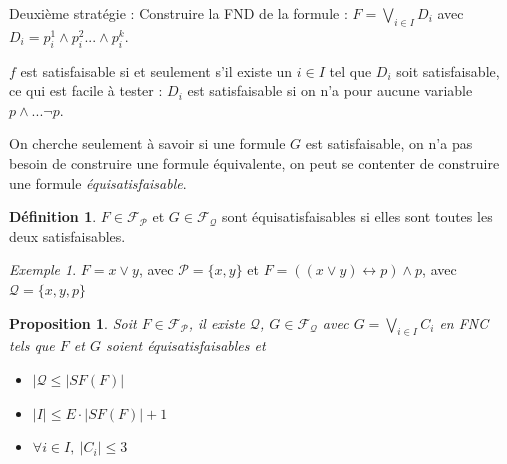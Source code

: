 \documentclass[]{article}
\newtheorem{myproposition}{Proposition}
\theoremstyle{remark}
\newtheorem{myexmpl}{Exemple}
\theoremstyle{definition}
\newtheorem{mydef}{Définition}
\begin{document}
Deuxième stratégie : Construire la FND de la formule : $F = \bigvee_{i \in I} D_i$ avec $D_i = p_i^1 \land p_i^2 ... \land p_i^k$. 

$f$ est satisfaisable si et seulement s'il existe un $i \in I$ tel que $D_i$ soit satisfaisable, ce qui est facile à tester : $D_i$ est satisfaisable si on n'a pour aucune variable $p \land ... \neg p$.

On cherche seulement à savoir si une formule $G$ est satisfaisable, on n'a pas besoin de construire une formule équivalente, on peut se contenter de construire une formule \textit{équisatisfaisable}.

\begin{mydef}
	$F \in \mathcal{F}_{\mathcal{P}}$ et $G \in \mathcal{F}_{\mathcal{Q}}$ sont équisatisfaisables si elles sont toutes les deux satisfaisables.
\end{mydef}


\begin{myexmpl}
	$F = x \lor y$, avec $\mathcal{P} = \{x, y\}$ et $F = ((x \lor y) \leftrightarrow p) \land p$, avec $\mathcal{Q} = \{x, y, p\}$
\end{myexmpl}

\begin{myproposition}
	Soit $F \in \mathcal{F}_{\mathcal{P}}$, il existe $\mathcal{Q}$,  $G \in \mathcal{F}_{\mathcal{Q}}$ avec $G = \bigvee_{i \in I}C_i$ en FNC tels que $F$ et $G$ soient équisatisfaisables et
	
	\begin{itemize}
		\item $|\mathcal{Q} \leqslant |SF(F)|$
		\item $|I| \leqslant E \cdot |SF(F)|+1$
		\item $\forall i \in I, ~ |C_i| \leqslant 3$
	\end{itemize}
\end{myproposition}

\newpage
\end{document}
